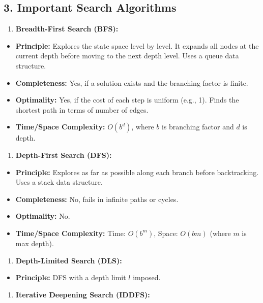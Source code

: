 \subsection{3. Important Search Algorithms}
\begin{enumerate}
  \item \textbf{Breadth-First Search (BFS):}
\end{enumerate}
\begin{itemize}
  \item   \textbf{Principle:} Explores the state space level by level. It expands all nodes at the current depth before moving to the next depth level. Uses a queue data structure.
  \item   \textbf{Completeness:} Yes, if a solution exists and the branching factor is finite.
  \item   \textbf{Optimality:} Yes, if the cost of each step is uniform (e.g., 1). Finds the shortest path in terms of number of edges.
  \item   \textbf{Time/Space Complexity:} $O(b^d)$, where $b$ is branching factor and $d$ is depth.
\end{itemize}
\begin{enumerate}
  \item \textbf{Depth-First Search (DFS):}
\end{enumerate}
\begin{itemize}
  \item   \textbf{Principle:} Explores as far as possible along each branch before backtracking. Uses a stack data structure.
  \item   \textbf{Completeness:} No, fails in infinite paths or cycles.
  \item   \textbf{Optimality:} No.
  \item   \textbf{Time/Space Complexity:} Time: $O(b^m)$, Space: $O(bm)$ (where $m$ is max depth).
\end{itemize}
\begin{enumerate}
  \item \textbf{Depth-Limited Search (DLS):}
\end{enumerate}
\begin{itemize}
  \item   \textbf{Principle:} DFS with a depth limit $l$ imposed.
\end{itemize}
\begin{enumerate}
  \item \textbf{Iterative Deepening Search (IDDFS):}
\end{enumerate}
